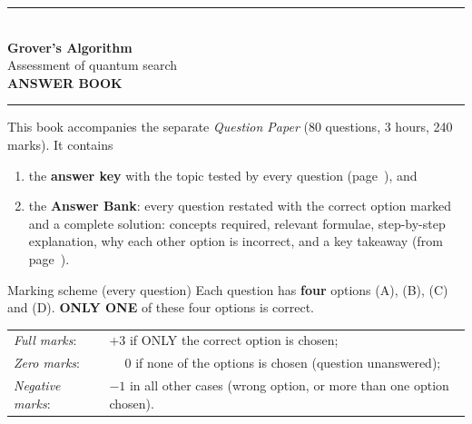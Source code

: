 \documentclass[11pt,a4paper]{article}
\begin{document}
\pagestyle{fancy}\fancyhf{}
\renewcommand{\headrulewidth}{0.4pt}

\thispagestyle{empty}
\begin{center}
{\color{brand}\rule{\linewidth}{1.2pt}}\\[6pt]
{\Huge\bfseries\color{brand} Grover's Algorithm}\\[4pt]
{\Large Assessment of quantum search}\\[4pt]
{\large\bfseries ANSWER BOOK}\\[2pt]
{\color{brand}\rule{\linewidth}{1.2pt}}
\end{center}
This book accompanies the separate \emph{Question Paper} (80 questions, 3 hours, 240 marks). It contains
\begin{enumerate}[leftmargin=1.4em, itemsep=0pt, topsep=2pt]
\item the \textbf{answer key} with the topic tested by every question (page~\pageref{key}), and
\item the \textbf{Answer Bank}: every question restated with the correct option marked \textcolor{okgreen}{} and a
      complete solution: concepts required, relevant formulae, step-by-step explanation, why each other option is
      incorrect, and a key takeaway (from page~\pageref{bank}).
\end{enumerate}
\begin{infobox}{Marking scheme (every question)}
Each question has \textbf{four} options (A), (B), (C) and (D). \textbf{ONLY ONE} of these four options is correct.\\[2pt]
\begin{tabular}{@{}ll@{}}
\emph{Full marks}: & $+3$ if ONLY the correct option is chosen;\\
\emph{Zero marks}: & $\phantom{+}0$ if none of the options is chosen (question unanswered);\\
\emph{Negative marks}: & $-1$ in all other cases (wrong option, or more than one option chosen).
\end{tabular}
\end{infobox}
\end{document}
